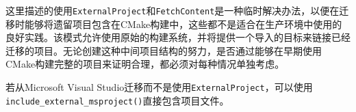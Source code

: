 \begin{tcolorbox}[colback=blue!5!white,colframe=blue!75!black,title=临时解决方案]
这里描述的使用\texttt{ExternalProject}和\texttt{FetchContent}是一种临时解决办法，以便在迁移时能够将遗留项目包含在CMake构建中，这些都不是适合在生产环境中使用的良好实践。该模式允许使用原始的构建系统，并将提供一个导入的目标来链接已经迁移的项目。无论创建这种中间项目结构的努力，是否通过能够在早期使用CMake构建完整的项目来证明合理，都必须对每种情况单独考虑。

若从Microsoft Visual Studio迁移而不是使用\texttt{ExternalProject}，可以使用\texttt{include\_external\_msproject()}直接包含项目文件。
\end{tcolorbox}


























